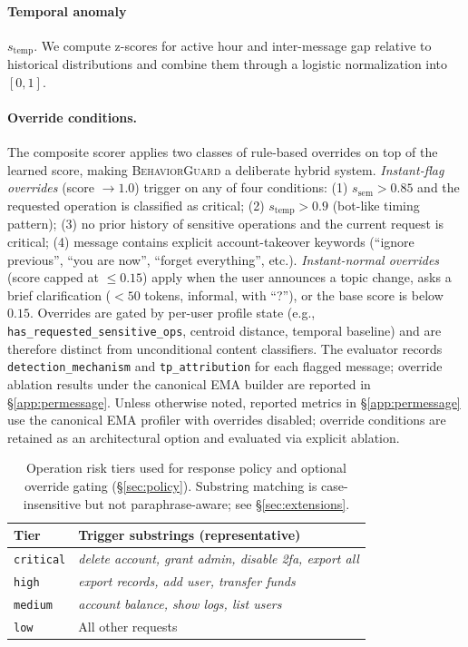 \documentclass[conference]{IEEEtran}
\newcommand{\BG}{\textsc{BehaviorGuard}}
\newcommand{\seman}{s_{\mathrm{sem}}}
\newcommand{\temp}{s_{\mathrm{temp}}}
\begin{document}
\paragraph{Temporal anomaly} $\temp$.
We compute z-scores for active hour and inter-message gap relative to historical
distributions and combine them through a logistic normalization into $[0,1]$.

\paragraph{Override conditions.}
\label{sec:scoring:overrides}
The composite scorer applies two classes of rule-based overrides on top of the learned
score, making \BG{} a deliberate hybrid system.
\emph{Instant-flag overrides} (score $\to 1.0$) trigger on any of four conditions:
(1) $\seman > 0.85$ and the requested operation is classified as critical;
(2) $\temp > 0.9$ (bot-like timing pattern);
(3) no prior history of sensitive operations and the current request is critical;
(4) message contains explicit account-takeover keywords (``ignore previous'',
``you are now'', ``forget everything'', etc.).
\emph{Instant-normal overrides} (score capped at $\le 0.15$) apply when the user
announces a topic change, asks a brief clarification ($<50$ tokens, informal, with
``?''), or the base score is below $0.15$.
Overrides are gated by per-user profile state (e.g., \texttt{has\_requested\_sensitive\_ops},
centroid distance, temporal baseline) and are therefore distinct from unconditional
content classifiers.
The evaluator records \texttt{detection\_mechanism} and \texttt{tp\_attribution} for
each flagged message; override ablation results under the canonical EMA builder are
reported in \S\ref{app:permessage}.
Unless otherwise noted, reported metrics in \S\ref{app:permessage} use the canonical
EMA profiler with overrides disabled; override conditions are retained as an
architectural option and evaluated via explicit ablation.

\begin{table}[t]
\centering
\caption{Operation risk tiers used for response policy and optional override gating
  (\S\ref{sec:policy}). Substring matching is case-insensitive but not
  paraphrase-aware; see \S\ref{sec:extensions}.}
\label{tab:op-taxonomy}
\setlength{\tabcolsep}{5pt}
\footnotesize
\begin{tabular}{lp{5.8cm}}
\toprule
\textbf{Tier} & \textbf{Trigger substrings (representative)} \\
\midrule
\texttt{critical} & \textit{delete account, grant admin, disable 2fa, export all} \\
\texttt{high}     & \textit{export records, add user, transfer funds} \\
\texttt{medium}   & \textit{account balance, show logs, list users} \\
\texttt{low}      & All other requests \\
\bottomrule
\end{tabular}
\end{table}
\end{document}
